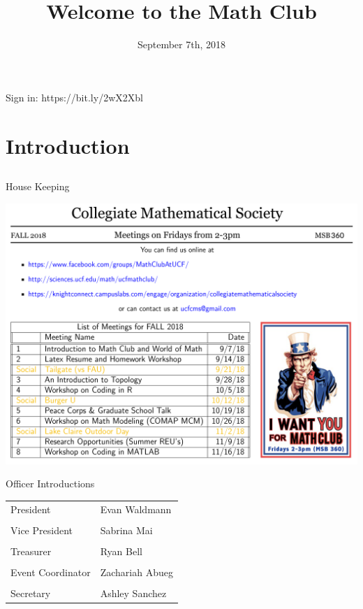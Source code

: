 \documentclass[xcolor=dvipsnames]{beamer}
\title[UCF Math Club Meeting 1]{Welcome to the Math Club}
\author{}
\institute{University of Central Florida}
\date{\scriptsize{September 7th, 2018}}
\begin{document}
\begin{frame}
  \titlepage
  \vfill
  
  \Huge Sign in: \color{blue} https://bit.ly/2wX2Xbl
\end{frame}

\section{Introduction}
\subsection{}
\begin{frame}{House Keeping}

\centering \includegraphics[width=.8\linewidth]{CMSminusparagraph.png}

\end{frame}

\begin{frame}{Officer Introductions}
\begin{center}

\begin{tabular}{p{4cm} p{4cm} }
    President & Evan Waldmann \\ \\ 
    Vice President & Sabrina Mai \\ \\
   Treasurer & Ryan Bell \\\\
   Event Coordinator & Zachariah Abueg \\\\
   Secretary & Ashley Sanchez \\
\end{tabular}
\end{center}
\end{frame}
\end{document}
